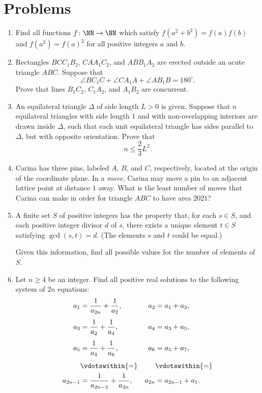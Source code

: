 \documentclass[11pt]{scrartcl}
\begin{document}
\section{Problems}
\begin{enumerate}[\bfseries 1.]
\item %
Find all functions $f \colon \NN \to \NN$
which satisfy $f(a^2+b^2)=f(a)f(b)$ and
$f(a^2)=f(a)^2$ for all positive integers $a$ and $b$.

\item %
Rectangles $BCC_1B_2$, $CAA_1C_2$, and $ABB_1A_2$ are erected
outside an acute triangle $ABC$. Suppose that
\[ \angle BC_1C + \angle CA_1A + \angle AB_1B = 180^\circ. \]
Prove that lines $B_1C_2$, $C_1A_2$, and $A_1B_2$ are concurrent.

\item %
An equilateral triangle $\Delta$ of side length $L > 0$ is given.
Suppose that $n$ equilateral triangles with side length $1$
and with non-overlapping interiors are drawn inside $\Delta$,
such that each unit equilateral triangle has sides parallel to $\Delta$,
but with opposite orientation.
Prove that \[ n \le \frac{2}{3} L^2. \]

\item %
Carina has three pins, labeled $A$, $B$, and $C$, respectively,
located at the origin of the coordinate plane.
In a \emph{move}, Carina may move a pin to
an adjacent lattice point at distance $1$ away.
What is the least number of moves that Carina can make
in order for triangle $ABC$ to have area $2021$?

\item %
A finite set $S$ of positive integers has the property that,
for each $s\in S$, and each positive integer divisor $d$ of $s$,
there exists a unique element $t\in S$ satisfying $\gcd(s,t) = d$.
(The elements $s$ and $t$ could be equal.)

Given this information, find all possible values for the
number of elements of $S$.

\item %
Let $n \ge 4$ be an integer.
Find all positive real solutions to the following
system of $2n$ equations:
\begin{align*}
  a_1 &= \frac{1}{a_{2n}} + \frac{1}{a_{2}}, & a_2 &= a_1 + a_3, \\[1ex]
  a_3 &= \frac{1}{a_{2}} + \frac{1}{a_{4}}, & a_4 &= a_3 + a_5, \\[1ex]
  a_5 &= \frac{1}{a_{4}} + \frac{1}{a_{6}}, & a_6 &= a_5 + a_7, \\[1ex]
  &\vdotswithin{=} &&\vdotswithin{=} \\
  a_{2n-1} &= \frac{1}{a_{2n-2}} + \frac{1}{a_{2n}}, & a_{2n} &= a_{2n-1} + a_1.
\end{align*}

\end{enumerate}
\pagebreak
\end{document}

